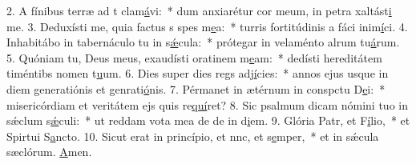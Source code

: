 2. A fínibus terræ ad t clam\uline{á}vi:~* dum anxiarétur cor meum, in petra xaltást\uline{i} me.
3. Deduxísti me, quia factus s spes m\uline{e}a:~* turris fortitúdinis a fáci inim\uline{í}ci.
4. Inhabitábo in tabernáculo tu in s\uline{ǽ}cula:~* prótegar in velaménto alrum tu\uline{á}rum.
5. Quóniam tu, Deus meus, exaudísti oratinem m\uline{e}am:~* dedísti hereditátem timéntibs nomen t\uline{u}um.
6. Dies super dies regs adj\uline{í}cies:~* annos ejus usque in diem generatiónis et genrati\uline{ó}nis.
7. Pérmanet in ætérnum in conspctu D\uline{e}i:~* misericórdiam et veritátem ejs quis re\uline{quí}ret?
8. Sic psalmum dicam nómini tuo in sǽclum s\uline{ǽ}culi:~* ut reddam vota mea de de in d\uline{i}em.
9. Glória Patr, et F\uline{í}lio,~* et Spirtui S\uline{a}ncto.
10. Sicut erat in princípio, et nnc, et s\uline{e}mper,~* et in sǽcula sæclórum. \uline{A}men.
